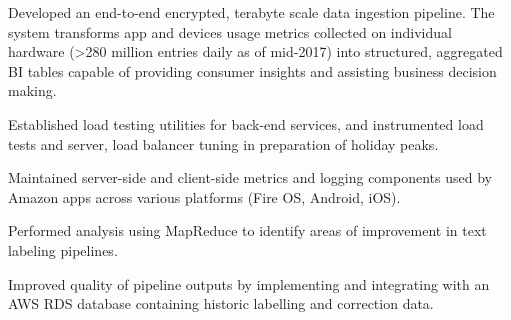 \documentclass[]{deedy-resume-openfont}
\begin{document}
\begin{minipage}[t]{0.64\textwidth}
\minigap
{}
\minigap
\begin{tightemize}
\item Developed an end-to-end encrypted, terabyte scale data ingestion pipeline. The system transforms app and devices usage metrics collected on individual hardware (>280 million entries daily as of mid-2017) into structured, aggregated BI tables capable of providing consumer insights and assisting business decision making.
\item Established load testing utilities for back-end services, and instrumented load tests and server, load balancer tuning in preparation of holiday peaks.
\item Maintained server-side and client-side metrics and logging components used by Amazon apps across various platforms (Fire OS, Android, iOS).
\end{tightemize}
\sectionsep

\minigap
{}
\minigap
\begin{tightemize}
\item Performed analysis using MapReduce to identify areas of improvement in text labeling pipelines.
\item Improved quality of pipeline outputs by implementing and integrating with an AWS RDS database containing historic labelling and correction data.
\end{tightemize}
\sectionsep




\end{minipage}
\end{document}
